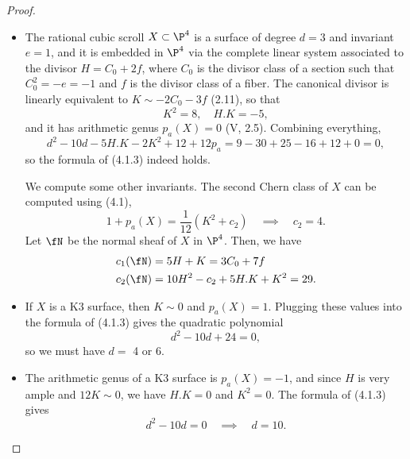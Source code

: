 \documentclass[a4paper]{article}
\begin{document}
\begin{enumerate} [label=\textbf{\arabic*.}, leftmargin=0em]
      \begin{proof} $ $ \vspace{0pt}
           \begin{itemize} [leftmargin=0cm]
            \item[(a)] The rational cubic scroll $X \subset \P^4$ is a surface of degree $d = 3$ and invariant $e = 1$, and it is embedded in $\P^4$ via the complete linear system associated to the divisor $H = C_0 + 2f$, where $C_0$ is the divisor class of a section such that $C_0^2 = -e = -1$ and $f$ is the divisor class of a fiber.
            The canonical divisor is linearly equivalent to $K \sim -2C_0 - 3f$ (2.11), so that $$K^2 = 8, \quad H.K =-5,$$ and it has arithmetic genus $p_a(X) = 0$ (V, 2.5).
            Combining everything,
            \begin{equation*}
                  d^2 - 10d - 5H.K - 2K^2 + 12 + 12p_a = 9 - 30 + 25 - 16 + 12 + 0 = 0,
            \end{equation*}
            so the formula of (4.1.3) indeed holds.

            We compute some other invariants.
            The second Chern class of $X$ can be computed using (4.1),
            \begin{equation*}
                  1 + p_a(X) = \frac{1}{12}(K^2 + c_2) \quad \implies \quad c_2 = 4.
            \end{equation*}
            Let $\fN$ be the normal sheaf of $X$ in $\P^4$.
            Then, we have
            \begin{align*}
                  c_1(\fN) & = 5H + K = 3C_0 + 7f \\
                  c_2(\fN) & = 10H^2 - c_2 + 5H.K + K^2 = 29.
            \end{align*}

            \item[(b)] If $X$ is a K3 surface, then $K \sim 0$ and $p_a(X) = 1$.
            Plugging these values into the formula of (4.1.3) gives the quadratic polynomial
            \begin{equation*}
                  d^2 - 10d + 24 = 0,
            \end{equation*}
            so we must have $d =$ 4 or 6.

            \item[(c)] The arithmetic genus of a K3 surface is $p_a(X) = -1$, and since $H$ is very ample and $12K \sim 0$, we have $H.K = 0$ and $K^2 = 0$.
            The formula of (4.1.3) gives
            \begin{equation*}
                  d^2 - 10d = 0 \quad \implies \quad d = 10.
            \end{equation*}
           \end{itemize} 
      \end{proof}


\end{enumerate}
\end{document}
